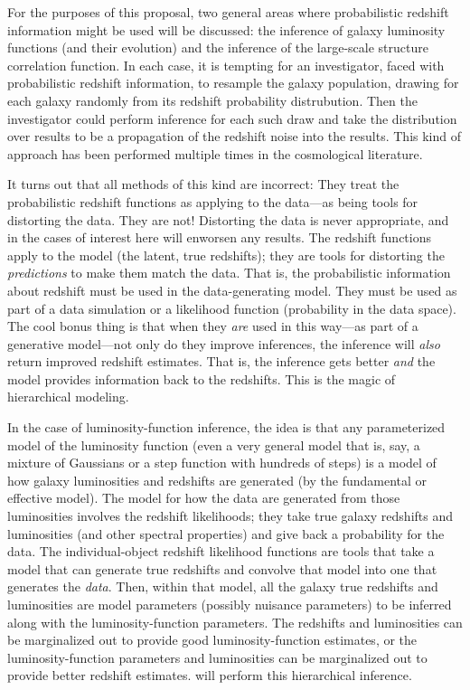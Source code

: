 \documentclass[12pt]{article}
\begin{document}
For the purposes of this proposal, two general areas where
probabilistic redshift information might be used will be discussed:
the inference of galaxy luminosity functions (and their evolution) and
the inference of the large-scale structure correlation function.
In each case, it is tempting for an investigator, faced with
probabilistic redshift information, to resample the galaxy population,
drawing for each galaxy randomly from its redshift probability
distrubution.
Then the investigator could perform inference for each such draw and
take the distribution over results to be a propagation of the redshift
noise into the results.
This kind of approach has been performed multiple times in the
cosmological literature.

It turns out that all methods of this kind are incorrect:
They treat the probabilistic redshift functions as applying to the
data---as being tools for distorting the data.
They are not!
Distorting the data is never appropriate, and in the cases of interest
here will enworsen any results.
The redshift functions apply to the model (the latent, true redshifts); they are tools
for distorting the \emph{predictions} to make them match the data.
That is, the probabilistic information about redshift must be used in
the data-generating model.
They must be used as part of a data simulation or a likelihood
function (probability in the data space).
The cool bonus thing is that when they \emph{are} used in this way---as part
of a generative model---not only do they improve inferences, the
inference will \emph{also} return improved redshift estimates.  That
is, the inference gets better \emph{and} the model provides
information back to the redshifts.
This is the magic of hierarchical modeling.

In the case of luminosity-function inference,
the idea is that any parameterized model of the luminosity function
(even a very general model that is, say, a mixture of Gaussians or a
step function with hundreds of steps) is a model of how galaxy
luminosities and redshifts are generated (by the fundamental or
effective model).
The model for how the data are generated from those luminosities
involves the redshift likelihoods; they take true galaxy redshifts and
luminosities (and other spectral properties) and give back a
probability for the data.
The individual-object redshift likelihood functions are tools that
take a model that can generate true redshifts and convolve that model
into one that generates the \emph{data}.
Then, within that model, all the galaxy true redshifts and
luminosities are model parameters (possibly nuisance parameters) to be
inferred along with the luminosity-function parameters.
The redshifts and luminosities can be marginalized out to provide good
luminosity-function estimates,
or the luminosity-function parameters and luminosities can be marginalized
out to provide better redshift estimates.
 will perform this hierarchical inference.
\end{document}
